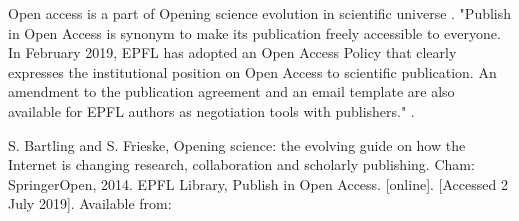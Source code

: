 \documentclass[a4paper]{article}
\begin{document}


Open access is a part of Opening science evolution in scientific universe \cite{Bartling2014}.
"Publish in Open Access is synonym to make its publication freely accessible to everyone. In February 2019, EPFL has adopted an Open Access Policy that clearly expresses the institutional position on Open Access to scientific
publication. An amendment to the publication agreement and an email template are also available for EPFL authors as negotiation tools with publishers." \cite{EPFLlibrary2019}.
 \begin{thebibliography}{10}
  S. Bartling and S. Frieske, Opening science: the evolving guide on how the Internet is changing research, collaboration and scholarly publishing. Cham: SpringerOpen, 2014.
  EPFL Library, Publish in Open Access. [online]. [Accessed 2 July 2019]. Available from:
  \end{thebibliography}
\end{document}
